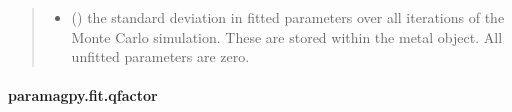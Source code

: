 \documentclass[a4paper,10pt,english]{sphinxmanual}
\begin{document}
\begin{fulllineitems}
\begin{quote}
\begin{description}
\begin{itemize}
\item {} 
 () \textendash{} the standard deviation in fitted parameters over all iterations of the
Monte Carlo simulation.
These are stored within the metal object. All unfitted parameters
are zero.

\end{itemize}


\end{description}\end{quote}

\end{fulllineitems}



\paragraph{paramagpy.fit.qfactor}
\label{\detokenize{reference/generated/paramagpy.fit.qfactor:paramagpy-fit-qfactor}}\label{\detokenize{reference/generated/paramagpy.fit.qfactor::doc}}
\end{document}
